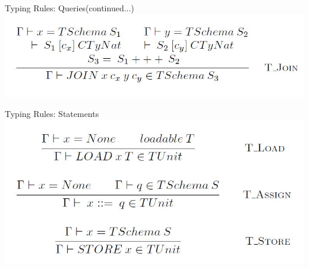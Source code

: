 \begin{frame}{Typing Rules: Queries(continued...)}
\centering
\includegraphics[scale=0.4]{Images/TypingRules/Join.JPG} 
\end{frame}

\begin{frame}{Typing Rules: Statements}
\centering
\includegraphics[scale=0.4]{Images/TypingRules/Load_Assign_Store.JPG} 
\end{frame}

